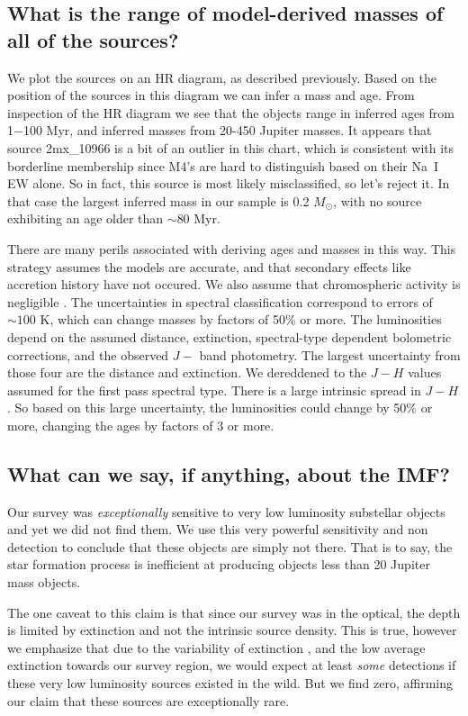 \subsection{What is the range of model-derived masses of all of the sources?}
We plot the sources on an HR diagram, as described previously.  Based on the position of the sources in this diagram we can infer a mass and age.  From inspection of the HR diagram we see that the objects range in inferred ages from 1$-$100 Myr, and inferred masses from 20-450 Jupiter masses.  It appears that source 2mx\_10966 is a bit of an outlier in this chart, which is consistent with its borderline membership since M4's are hard to distinguish based on their Na~I EW alone.  So in fact, this source is most likely misclassified, so let's reject it.  In that case the largest inferred mass in our sample is 0.2 $M_{\odot}$, with no source exhibiting an age older than $\sim80$ Myr.


There are many perils associated with deriving ages and masses in this way.  This strategy assumes the models are accurate, and that secondary effects like accretion history have not occured.  We also assume that chromospheric activity is negligible \citep{2014ApJ...796..119S}.  The uncertainties in spectral classification correspond to errors of $\sim100$ K, which can change masses by factors of 50\% or more.  The luminosities depend on the assumed distance, extinction, spectral-type dependent bolometric corrections, and the observed $J-$ band photometry.  The largest uncertainty from those four are the distance and extinction.  We dereddened to the $J-H$ values assumed for the first pass spectral type.  There is a large intrinsic spread in $J-H$.  So based on this large uncertainty, the luminosities could change by 50\% or more, changing the ages by factors of 3 or more.  


\subsection{What can we say, if anything, about the IMF?}

Our survey was \emph{exceptionally} sensitive to very low luminosity substellar objects and yet we did not find them.  We use this very powerful sensitivity and non detection to conclude that these objects are simply not there.  That is to say, the star formation process is inefficient at producing objects less than 20 Jupiter mass objects.  

The one caveat to this claim is that since our survey was in the optical, the depth is limited by extinction and not the intrinsic source density.  This is true, however we emphasize that due to the variability of extinction \citep{2008A&A...489..143L}, and the low average extinction towards our survey region, we would expect at least \emph{some} detections if these very low luminosity sources existed in the wild.  But we find zero, affirming our claim that these sources are exceptionally rare.  

